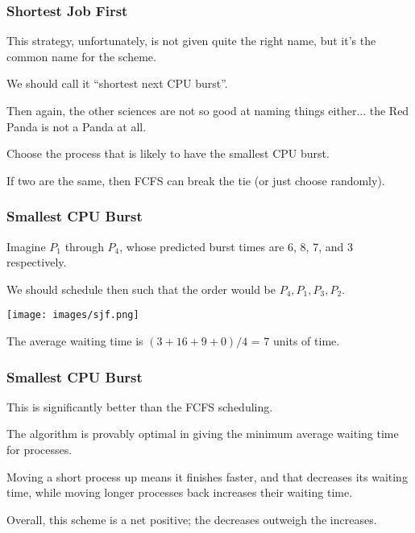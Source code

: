 \begin{frame}
\frametitle{Shortest Job First}

This strategy, unfortunately, is not given quite the right name, but it's the common name for the scheme. 

We should call it ``shortest next CPU burst''.

Then again, the other sciences are not so good at naming things either... the Red Panda is not a Panda at all.

Choose the process that is likely to have the smallest CPU burst. 

If two are the same, then FCFS can break the tie (or just choose randomly). 


\end{frame}

\begin{frame}
\frametitle{Smallest CPU Burst}

 

Imagine $P_{1}$ through $P_{4}$, whose predicted burst times are 6, 8, 7, and 3 respectively. 

We should schedule then such that the order would be $P_{4}, P_{1}, P_{3}, P_{2}$.

\begin{center}
\texttt{[image: images/sjf.png]}
\end{center}

The average waiting time is $(3 + 16 + 9 + 0) / 4$ = 7 units of time. 

\end{frame}

\begin{frame}
\frametitle{Smallest CPU Burst}

This is significantly better than the FCFS scheduling. 

The algorithm is provably optimal in giving the minimum average waiting time for processes. 

Moving a short process up means it finishes faster, and that decreases its waiting time, while moving longer processes back increases their waiting time. 

Overall, this scheme is a net positive; the decreases outweigh the increases.

\end{frame}

